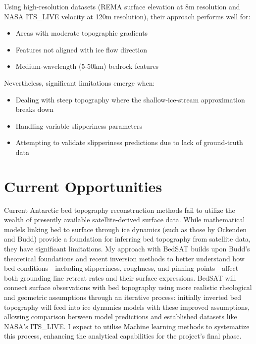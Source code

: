Using high-resolution datasets (REMA surface elevation at 8m resolution and NASA ITS\_LIVE velocity at 120m resolution), their approach performs well for:
\begin{itemize}
    \item Areas with moderate topographic gradients
    \item Features not aligned with ice flow direction
    \item Medium-wavelength (5-50km) bedrock features
\end{itemize}
\newpage
Nevertheless, significant limitations emerge when:
\begin{itemize}
    \item Dealing with steep topography where the shallow-ice-stream approximation breaks down
    \item Handling variable slipperiness parameters
    \item Attempting to validate slipperiness predictions due to lack of ground-truth data
\end{itemize}


\section{Current Opportunities}

Current Antarctic bed topography reconstruction methods fail to utilize the wealth of presently available satellite-derived surface data. While mathematical models linking bed to surface through ice dynamics (such as those by Ockenden and Budd) provide a foundation for inferring bed topography from satellite data, they have significant limitations. My approach with BedSAT builds upon Budd's theoretical foundations and recent inversion methods to better understand how bed conditions—including slipperiness, roughness, and pinning points—affect both grounding line retreat rates and their surface expressions. BedSAT will connect surface observations with bed topography using more realistic rheological and geometric assumptions through an iterative process: initially inverted bed topography will feed into ice dynamics models with these improved assumptions, allowing comparison between model predictions and established datasets like NASA's ITS\_LIVE. I expect to utilise Machine learning methods to systematize this process, enhancing the analytical capabilities for the project's final phase.